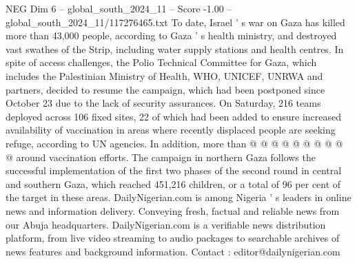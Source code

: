 \begin{textsample}{NEG Dim 6 – global\_south\_2024\_11 – Score -1.00 – global\_south\_2024\_11/117276465.txt}
To date, Israel ' s war on Gaza has killed more than 43,000 people, according to Gaza ' s health ministry, and destroyed vast swathes of the Strip, including water supply stations and health centres.
In spite of access challenges, the Polio Technical Committee for Gaza, which includes the Palestinian Ministry of Health, WHO, UNICEF, UNRWA and partners, decided to resume the campaign, which had been postponed since October 23 due to the lack of security assurances.
On Saturday, 216 teams deployed across 106 fixed sites, 22 of which had been added to ensure increased availability of vaccination in areas where recently displaced people are seeking refuge, according to UN agencies.
In addition, more than @ @ @ @ @ @ @ @ @ @ around vaccination efforts.
The campaign in northern Gaza follows the successful implementation of the first two phases of the second round in central and southern Gaza, which reached 451,216 children, or a total of 96 per cent of the target in these areas.
DailyNigerian.com is among Nigeria ' s leaders in online news and information delivery.
Conveying fresh, factual and reliable news from our Abuja headquarters.
DailyNigerian.com is a verifiable news distribution platform, from live video streaming to audio packages to searchable archives of news features and background information.
Contact : editor@dailynigerian.com

\end{textsample}
